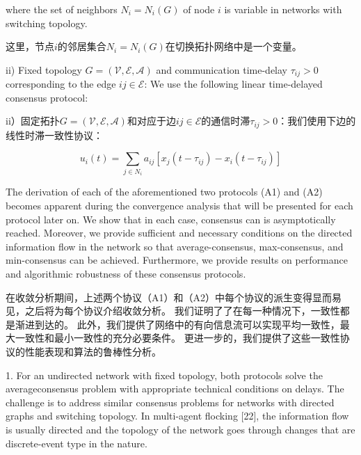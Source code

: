\documentclass{article}
\begin{document}

{\color[gray]{0.5}
\noindent where the set of neighbors $N_i=N_i(G)$ of node $i$ is variable in networks with switching topology.
}

\noindent 这里，节点$i$的邻居集合$N_i=N_i(G)$在切换拓扑网络中是一个变量。

{\color[gray]{0.5}
ii) Fixed topology $G=(\mathcal{V}, \mathcal{E}, \mathcal{A})$ and communication time-delay $\tau_{ij}>0$ corresponding to the edge $ij\in \mathcal{E}$: We use the following linear time-delayed consensus protocol:
}

ii）固定拓扑$G=(\mathcal{V}, \mathcal{E}, \mathcal{A})$和对应于边$ij\in \mathcal{E}$的通信时滞$\tau_{ij}>0$：我们使用下边的线性时滞一致性协议：

\begin{equation}
    u_i(t) = \sum_{j\in N_i}a_{ij}[x_j(t-\tau_{ij})-x_i(t-\tau_{ij})]
    \tag{A2}
    \label{A2}
\end{equation}


{\color[gray]{0.5}
The derivation of each of the aforementioned two protocols (A1) and (A2) becomes apparent during the convergence analysis that will be presented for each protocol later on. 
We show that in each case, consensus can is asymptotically reached. 
Moreover, we provide suﬃcient and necessary conditions on the directed information ﬂow in the network so that average-consensus, max-consensus, and min-consensus can be achieved. 
Furthermore, we provide results on performance and algorithmic robustness of these consensus protocols.
}

在收敛分析期间，上述两个协议（A1）和（A2）中每个协议的派生变得显而易见，之后将为每个协议介绍收敛分析。
我们证明了了在每一种情况下，一致性都是渐进到达的。
此外，我们提供了网络中的有向信息流可以实现平均一致性，最大一致性和最小一致性的充分必要条件。
更进一步的，我们提供了这些一致性协议的性能表现和算法的鲁棒性分析。

{\color[gray]{0.5}
 1. For an undirected network with ﬁxed topology, both protocols solve the averageconsensus problem with appropriate technical conditions on delays. 
The challenge is to address similar consensus problems for networks with directed graphs and switching topology. 
In multi-agent ﬂocking [22], the information ﬂow is usually directed and the topology of the network goes through changes that are discrete-event type in the nature.
}
\end{document}
